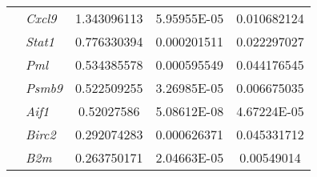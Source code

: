 \begin{table}[ht!]
\begin{tabularx}{\textwidth}{xxCCC}
       & \textit{Cxcl9} &	1.343096113 &	\num{5.95955E-05} &	0.010682124 \\
     & \textit{Stat1} &	0.776330394 &	0.000201511 &	0.022297027 \\
     & \textit{Pml} &	0.534385578 &	0.000595549 &	0.044176545 \\
     & \textit{Psmb9} &	0.522509255 &	\num{3.26985E-05} &	0.006675035 \\
     & \textit{Aif1} &	0.52027586 &	\num{5.08612E-08} & \num{4.67224E-05}	 \\
     & \textit{Birc2} &	0.292074283 &	0.000626371 &	0.045331712 \\
     & \textit{B2m} &	0.263750171 &	\num{2.04663E-05} &	0.00549014 \\
     \bottomrule
  \end{tabularx}
  \vspace{0.1cm}
\end{table}

\clearpage


